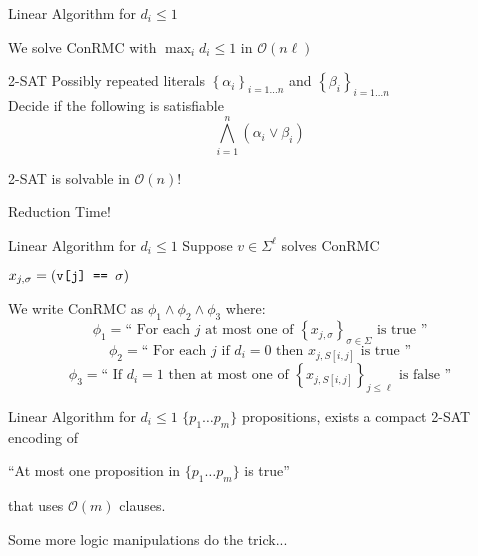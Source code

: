 \documentclass{beamer}
\renewcommand{\l}{\left}
\renewcommand{\r}{\right}
\begin{document}
\begin{frame}{Linear Algorithm for $d_i \leq 1$}

  \begin{center}
    We solve ConRMC with $\max_i d_i \leq 1$ in $\mathcal{O}\l(n\ell\r)$
  \end{center}
\pause
    \begin{block}{2-SAT}
      Possibly repeated literals $\l\{\alpha_i\r\}_{i = 1
        \dots n}$ and $\l\{\beta_i\r\}_{i = 1 \dots n}$ \\
      Decide if the following is satisfiable 
      $$\bigwedge_{i = 1}^n \l(\alpha_i \lor
      \beta_i\r)$$
    
    \end{block}

    \begin{center}
      2-SAT is solvable in $\mathcal{O}(n)$!
    \end{center}
\pause
    \begin{center}
      \Huge{Reduction Time!}
    \end{center}
    
\end{frame}

\begin{frame}{Linear Algorithm for $d_i \leq 1$}
  Suppose $v \in \Sigma^\ell $ solves ConRMC
  \begin{center}
    $x_{j, \sigma} = \l(\text{\texttt{v[j] == $\sigma$}} \r)$
  \end{center}
\pause
  We write ConRMC as $\phi_1 \land \phi_2 \land \phi_3$ where:
  \begin{equation*}
    \phi_1
    = \text{`` For each $j$ at most one of $\l\{x_{j,
        \sigma}\r\}_{\sigma \in \Sigma}$ is true ''}
\end{equation*}
\pause
\begin{equation*}
  \phi_2 = \text{`` For each $j$ if $d_i = 0$ then $x_{j, S[i,j]}$ is true ''} 
\end{equation*}
\pause
\begin{equation*}
  \phi_3 = \text{`` If $d_i = 1$ then at most one of $\l\{x_{j, S[i,
      j]}\r\}_{j \leq \ell}$ is false ''} 
\end{equation*}
  
\end{frame}

\begin{frame}{Linear Algorithm for $d_i \leq 1$}
$\{p_1 \dots p_m\}$ propositions, exists a compact 2-SAT
encoding of

\begin{center}
  ``At most one proposition in $\{p_1 \dots p_m\}$ is true'' 
\end{center}

that uses $\mathcal{O}(m)$ clauses. 
\pause
\vspace{3em}
\begin{center}
  {\LARGE Some more logic manipulations do the trick...}
\end{center}

\end{frame}
\end{document}
